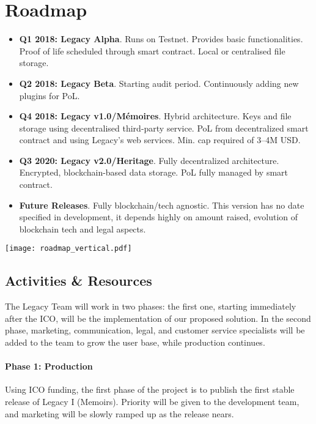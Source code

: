 \chapter{Roadmap} %
\label{cha:roadmap}

\begin{itemize}
	\item \textbf{Q1 2018: Legacy Alpha}. Runs on Testnet. Provides basic functionalities. Proof of life scheduled through smart contract. Local or centralised file storage.
	\item \textbf{Q2 2018: Legacy Beta}. Starting audit period. Continuously adding new plugins for PoL.
	\item \textbf{Q4 2018: Legacy v1.0/Mémoires}. Hybrid architecture. Keys and file storage using decentralised third-party service. PoL from decentralized smart contract and using Legacy's web services. Min. cap required of 3–4M USD.
	\item \textbf{Q3 2020: Legacy v2.0/Heritage}. Fully decentralized architecture. Encrypted, blockchain-based data storage. PoL fully managed by smart contract.
	\item \textbf{Future Releases}. Fully blockchain/tech agnostic. This version has no date specified in development, it depends highly on amount raised, evolution of blockchain tech and legal aspects.
\end{itemize}


\texttt{[image: roadmap\_vertical.pdf]}

\section{Activities & Resources} %
\label{sec:activities_resources}
The Legacy Team will work in two phases: the first one, starting immediately after the ICO, will be the implementation of our proposed solution. In the second phase, marketing, communication, legal, and customer service specialists will be added to the team to grow the user base, while production continues.

\subsubsection*{Phase 1: Production} %
\label{ssub:phase_1_production}
Using ICO funding, the first phase of the project is to publish the first stable release of Legacy I (Memoirs). Priority will be given to the development team, and marketing will be slowly ramped up as the release nears.

